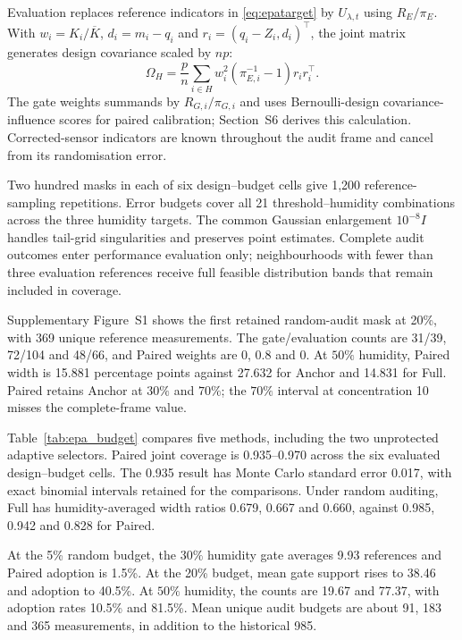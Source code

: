 Evaluation replaces reference indicators in \eqref{eq:epatarget} by $U_{\lambda,t}$ using $R_E/\pi_E$.
With $w_i=K_i/\overline K$, $d_i=m_i-q_i$ and $r_i=(q_i-Z_i,d_i)^\top$, the joint matrix generates design covariance scaled by $np$:
\begin{equation}\label{eq:epacov}
 \Omega_H=\frac pn\sum_{i\in H}w_i^2(\pi_{E,i}^{-1}-1)r_ir_i^\top.
\end{equation}
The gate weights summands by $R_{G,i}/\pi_{G,i}$ and uses Bernoulli-design covariance-influence scores for paired calibration; Section~S6 derives this calculation.
Corrected-sensor indicators are known throughout the audit frame and cancel from its randomisation error.

Two hundred masks in each of six design--budget cells give 1,200 reference-sampling repetitions.
Error budgets cover all 21 threshold--humidity combinations across the three humidity targets.
The common Gaussian enlargement $10^{-8}I$ handles tail-grid singularities and preserves point estimates.
Complete audit outcomes enter performance evaluation only; neighbourhoods with fewer than three evaluation references receive full feasible distribution bands that remain included in coverage.

Supplementary Figure~S1 shows the first retained random-audit mask at 20\%, with 369 unique reference measurements.
The gate/evaluation counts are 31/39, 72/104 and 48/66, and Paired weights are 0, 0.8 and 0.
At $50\%$ humidity, Paired width is 15.881 percentage points against 27.632 for Anchor and 14.831 for Full.
Paired retains Anchor at $30\%$ and $70\%$; the $70\%$ interval at concentration 10 misses the complete-frame value.

Table~\ref{tab:epa_budget} compares five methods, including the two unprotected adaptive selectors.
Paired joint coverage is 0.935--0.970 across the six evaluated design--budget cells.
The 0.935 result has Monte Carlo standard error 0.017, with exact binomial intervals retained for the comparisons.
Under random auditing, Full has humidity-averaged width ratios 0.679, 0.667 and 0.660, against 0.985, 0.942 and 0.828 for Paired.

At the 5\% random budget, the $30\%$ humidity gate averages 9.93 references and Paired adoption is 1.5\%.
At the 20\% budget, mean gate support rises to 38.46 and adoption to 40.5\%.
At $50\%$ humidity, the counts are 19.67 and 77.37, with adoption rates 10.5\% and 81.5\%.
Mean unique audit budgets are about 91, 183 and 365 measurements, in addition to the historical 985.

